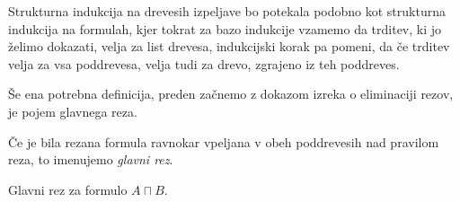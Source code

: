 \begin{definicija}
    Strukturna indukcija na drevesih izpeljave bo potekala podobno kot strukturna indukcija na formulah, kjer tokrat za bazo indukcije vzamemo da trditev, ki jo želimo dokazati, velja za list drevesa, indukcijski korak pa pomeni, da če trditev velja za vsa poddrevesa, velja tudi za drevo, zgrajeno iz teh poddreves.
\end{definicija}

Še ena potrebna definicija, preden začnemo z dokazom izreka o eliminaciji rezov, je pojem glavnega reza.

\begin{definicija} \label{gl rez}
    Če je bila rezana formula ravnokar vpeljana v obeh poddrevesih nad pravilom reza, to imenujemo \emph{glavni rez}.
\end{definicija}

\begin{primer*} \label{gl rez in}
    Glavni rez za formulo $A \sqcap B$.
    \begin{prooftree}


    \end{prooftree}
\end{primer*}
